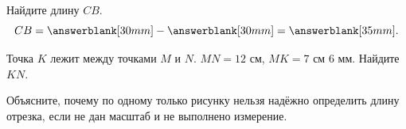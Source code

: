 \partsproblemfigure

\begin{practicebox}[Задание 7]
  Найдите длину \(CB\).
  \[
    CB=\answerblank[30mm]-\answerblank[30mm]=\answerblank[35mm].
  \]
\end{practicebox}

\begin{checkpointbox}
  Точка \(K\) лежит между точками \(M\) и \(N\).
  \(MN=12\text{ см}\), \(MK=7\text{ см }6\text{ мм}\).
  Найдите \(KN\).
\end{checkpointbox}

\begin{reflectionbox}[Итог]
  Объясните, почему по одному только рисунку нельзя надёжно определить
  длину отрезка, если не дан масштаб и не выполнено измерение.
\end{reflectionbox}
